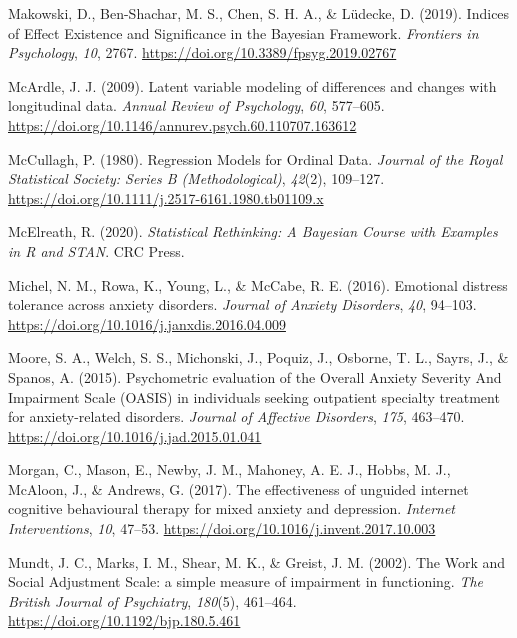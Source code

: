 \documentclass[
  man,floatsintext]{apa7}
\newlength{\cslhangindent}
\newlength{\cslentryspacingunit} %
\newenvironment{CSLReferences}[2] %
 {%
  \setlength{\parindent}{0pt}
  \ifodd #1
  \let\oldpar\par
  \def\par{\hangindent=\cslhangindent\oldpar}
  \fi
  \setlength{\parskip}{#2\cslentryspacingunit}
 }%
 {}
\begin{document}
\begin{CSLReferences}{1}{0}
\leavevmode{}%
Makowski, D., Ben-Shachar, M. S., Chen, S. H. A., \& Lüdecke, D. (2019). Indices of Effect Existence and Significance in the Bayesian Framework. \emph{Frontiers in Psychology}, \emph{10}, 2767. \url{https://doi.org/10.3389/fpsyg.2019.02767}

\leavevmode{}%
McArdle, J. J. (2009). Latent variable modeling of differences and changes with longitudinal data. \emph{Annual Review of Psychology}, \emph{60}, 577--605. \url{https://doi.org/10.1146/annurev.psych.60.110707.163612}

\leavevmode{}%
McCullagh, P. (1980). Regression Models for Ordinal Data. \emph{Journal of the Royal Statistical Society: Series B (Methodological)}, \emph{42}(2), 109--127. \url{https://doi.org/10.1111/j.2517-6161.1980.tb01109.x}

\leavevmode{}%
McElreath, R. (2020). \emph{Statistical Rethinking: A Bayesian Course with Examples in R and STAN}. CRC Press.

\leavevmode{}%
Michel, N. M., Rowa, K., Young, L., \& McCabe, R. E. (2016). Emotional distress tolerance across anxiety disorders. \emph{Journal of Anxiety Disorders}, \emph{40}, 94--103. \url{https://doi.org/10.1016/j.janxdis.2016.04.009}

\leavevmode{}%
Moore, S. A., Welch, S. S., Michonski, J., Poquiz, J., Osborne, T. L., Sayrs, J., \& Spanos, A. (2015). Psychometric evaluation of the Overall Anxiety Severity And Impairment Scale (OASIS) in individuals seeking outpatient specialty treatment for anxiety-related disorders. \emph{Journal of Affective Disorders}, \emph{175}, 463--470. \url{https://doi.org/10.1016/j.jad.2015.01.041}

\leavevmode{}%
Morgan, C., Mason, E., Newby, J. M., Mahoney, A. E. J., Hobbs, M. J., McAloon, J., \& Andrews, G. (2017). The effectiveness of unguided internet cognitive behavioural therapy for mixed anxiety and depression. \emph{Internet Interventions}, \emph{10}, 47--53. \url{https://doi.org/10.1016/j.invent.2017.10.003}

\leavevmode{}%
Mundt, J. C., Marks, I. M., Shear, M. K., \& Greist, J. M. (2002). The Work and Social Adjustment Scale: a simple measure of impairment in functioning. \emph{The British Journal of Psychiatry}, \emph{180}(5), 461--464. \url{https://doi.org/10.1192/bjp.180.5.461}


\end{CSLReferences}
\end{document}
